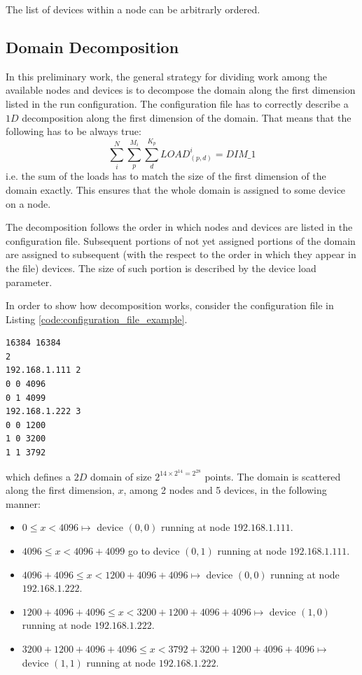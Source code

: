 The list of devices within a node can be arbitrarly ordered.



\subsection{Domain Decomposition}
\label{sec:domain_decomposition}
In this preliminary work, the general strategy for dividing work among the available nodes and devices is to decompose the domain along the first dimension listed in the run configuration. The configuration file has to correctly describe a $1D$ decomposition along the first dimension of the domain. That means that the following has to be always true:
\[
\sum_i^N \sum_p^{M_i} \sum_d^{K_p} LOAD^i_{(p,d)} = DIM\_1
\]
i.e. the sum of the loads has to  match the size of the first dimension of the domain exactly. This ensures that the whole domain is assigned to some device on a node.

The decomposition follows the order in which nodes and devices are listed in the configuration file. Subsequent portions of not yet assigned portions of the domain are assigned to subsequent (with the respect to the order in which they appear in the file) devices. The size of such portion is described by the device load parameter.

 In order to show how decomposition works, consider the  configuration file in Listing \ref{code:configuration_file_example}.
 \begin{minipage}{\linewidth}
\begin{lstlisting}
16384 16384
2
192.168.1.111 2  
0 0 4096
0 1 4099
192.168.1.222 3
0 0 1200
1 0 3200
1 1 3792
\end{lstlisting}
\end{minipage}
which defines a $2D$ domain of size $2^{{14} \times 2^{{14}} = 2^{28}}$ points.
The domain is scattered along the first dimension, $x$, among 2 nodes and 5 devices, in the following manner:
\begin{itemize}
	\item $0 \leq x < 4096 \longmapsto$  device $(0,0)$ running at node $192.168.1.111$.
	\item  $4096 \leq x < 4096+4099$ go to device $(0,1)$ running at node $192.168.1.111$.
	
	\item  $4096+4096\leq x < 1200+4096+4096 \longmapsto$  device $(0,0)$ running at node $192.168.1.222$.
	\item  $1200+4096+4096\leq x < 3200+1200+4096+4096 \longmapsto$  device $(1,0)$ running at node $192.168.1.222$.
	\item  $3200+1200+4096+4096\leq x < 3792+3200+1200+4096+4096 \longmapsto$  device $(1,1)$ running at node $192.168.1.222$.
\end{itemize}



